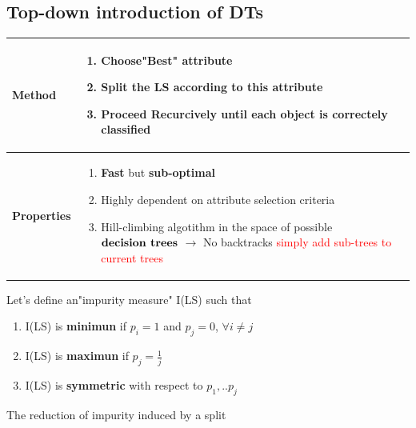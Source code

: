 \subsection{Top-down introduction of DTs}

  \begin{table}[H]
    \begin{center}
    \begin{tabular}{| m{8em}| m{30em}|}
    \hline
    \centering
    \rowcolor{blue.g} \textbf{Method}     &  \begin{enumerate}
                                                \item Choose"Best" attribute
                                                \item Split the LS according to this attribute
                                                \item Proceed Recurcively until each object is correctely classified
                                            \end{enumerate} \\\hline    
    \centering
    \rowcolor{vert.g} \textbf{Properties}     &  \begin{enumerate}
    \item  \textbf{Fast} but \textbf{sub-optimal}
    \item Highly dependent on attribute selection criteria
    \item Hill-climbing algotithm in the space of possible $\textbf{decision trees}$ $\rightarrow$ No backtracks \textcolor{red}{simply add sub-trees to current trees}
\end{enumerate}\\ \hline
                                                                                
    \end{tabular}
    \end{center}
    \end{table}
    
Let's define an"impurity measure" I(LS) such that
\begin{enumerate}
    \item I(LS) is \textbf{minimun} if $p_i=1 $ and $p_j=0$, $\forall i \ne j$
    \item I(LS) is \textbf{maximun} if $p_j = \frac{1}{j}$
    \item I(LS) is \textbf{symmetric} with respect to $p_1,..p_j$
\end{enumerate}
The reduction of impurity induced by a split 

